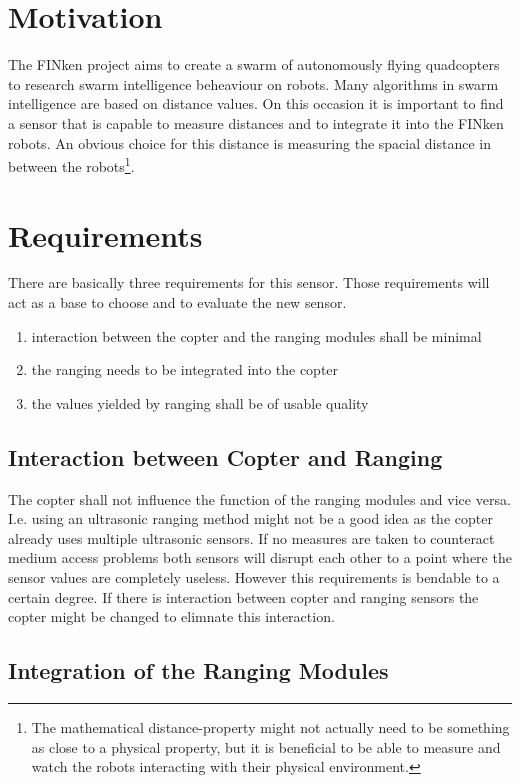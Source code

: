 \section{Motivation}

The FINken project aims to create a swarm of autonomously flying quadcopters to research swarm intelligence beheaviour on robots.
Many algorithms in swarm intelligence are based on distance values. 
On this occasion it is important to find a sensor that is capable to measure distances and to integrate it into the FINken robots.
An obvious choice for this distance is measuring the spacial distance in between the robots\footnote{
The mathematical distance-property might not actually need to be something as close to a physical property, but it is beneficial to be able to measure and watch the robots interacting with their physical environment.}.

\section{Requirements}
There are basically three requirements for this sensor. 
Those requirements will act as a base to choose and to evaluate the new sensor.

\begin{enumerate}
	\item interaction between the copter and the ranging modules shall be minimal
	\item the ranging needs to be integrated into the copter
	\item the values yielded by ranging shall be of usable quality
\end{enumerate}

\subsection{Interaction between Copter and Ranging}
The copter shall not influence the function of the ranging modules and vice versa.
I.e. using an ultrasonic ranging method might not be a good idea as the copter already uses multiple ultrasonic sensors.
If no measures are taken to counteract medium access problems both sensors will disrupt each other to a point where the sensor values are completely useless.
However this requirements is bendable to a certain degree.
If there is interaction between copter and ranging sensors the copter might be changed to elimnate this interaction.

\subsection{Integration of the Ranging Modules}


